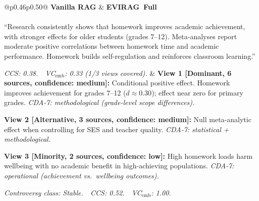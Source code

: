 \documentclass[11pt]{article}
\newcommand{\system}{\textsc{EVIRAG}\xspace}
\begin{document}
\begin{table}[!htbp]
\centering\small
\setlength{\tabcolsep}{5pt}
\begin{tabular}{@{}p{}p{}@{}}
\toprule
\textbf{Vanilla RAG} & \textbf{\system\ Full} \\
\midrule
{} \\
\midrule
``Research consistently shows that homework improves academic
achievement, with stronger effects for older students (grades 7--12).
Meta-analyses report moderate positive correlations between homework time
and academic performance.  Homework builds self-regulation and reinforces
classroom learning.''

\smallskip
\textit{CCS: 0.38.\ \ VC$_\text{emb}$: 0.33 (1/3 views covered).}
&
\textbf{View 1 [Dominant, 6 sources, confidence: medium]:} Conditional
positive effect.  Homework improves achievement for grades 7--12 ($d{\approx}0.30$);
effect near zero for primary grades.
\textit{CDA-7: methodological (grade-level scope differences).}

\textbf{View 2 [Alternative, 3 sources, confidence: medium]:} Null
meta-analytic effect when controlling for SES and teacher quality.
\textit{CDA-7: statistical + methodological.}

\textbf{View 3 [Minority, 2 sources, confidence: low]:} High homework
loads harm wellbeing with no academic benefit in high-achieving populations.
\textit{CDA-7: operational (achievement vs.\ wellbeing outcomes).}

\smallskip
\textit{Controversy class: Stable.\ \ CCS: 0.52.\ \ VC$_\text{emb}$: 1.00.}
\\
\bottomrule
\end{tabular}
\caption{Homework query: Vanilla RAG collapses to the dominant conditional-benefit
view; \system\ Full recovers all three ground-truth viewpoints with per-view
source counts, CDA-7 causal attribution, and evidence-structured confidence.}
\label{tab:qualitative}
\end{table}
\end{document}
